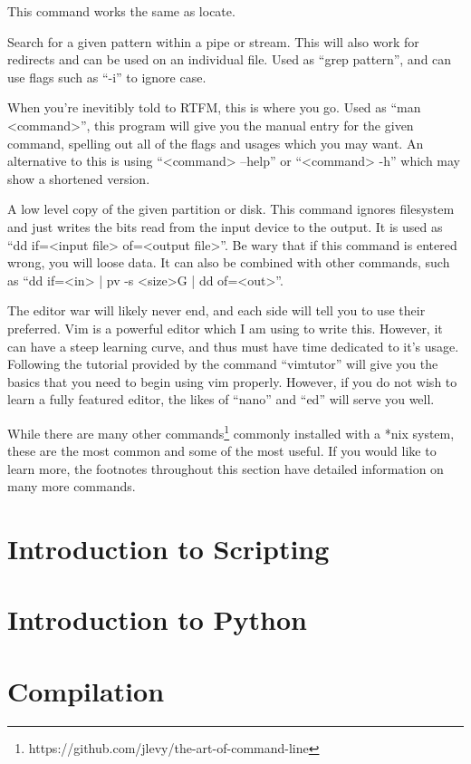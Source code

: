\documentclass[a4paper,11pt]{report}
\begin{document}
\begin{description}
				This command works the same as locate. 
			\item[grep]
				Search for a given pattern within a pipe or stream. 
				This will also work for redirects and can be used on an individual file. 
				Used as ``grep pattern'', and can use flags such as ``-i'' to ignore case. 
			\item[man\footnote{\url{http://linux.die.net/man/}}]
				When you're inevitibly told to RTFM, this is where you go. 
				Used as ``man <command>'', this program will give you the manual entry for the given command, spelling out all of the flags and usages which you may want. 
				An alternative to this is using ``<command> --help'' or ``<command> -h'' which may show a shortened version. 
			\item[dd]
				A low level copy of the given partition or disk. 
				This command ignores filesystem and just writes the bits read from the input device to the output. 
				It is used as ``dd if=<input file> of=<output file>''.
				Be wary that if this command is entered wrong, you will loose data. 
				It can also be combined with other commands, such as ``dd if=<in> | pv -s <size>G | dd of=<out>''.
			\item[vim]
				The editor war will likely never end, and each side will tell you to use their preferred. 
				Vim is a powerful editor which I am using to write this. 
				However, it can have a steep learning curve, and thus must have time dedicated to it's usage. 
				Following the tutorial provided by the command ``vimtutor'' will give you the basics that you need to begin using vim properly. 
				However, if you do not wish to learn a fully featured editor, the likes of ``nano'' and ``ed'' will serve you well. 
		\end{description}
		While there are many other commands\footnote{https://github.com/jlevy/the-art-of-command-line} commonly installed with a \**nix system, these are the most common and some of the most useful. If you would like to learn more, the footnotes throughout this section have detailed information on many more commands. 

	\section{Introduction to Scripting}
	\section{Introduction to Python}
	\section{Compilation}
\end{document}
